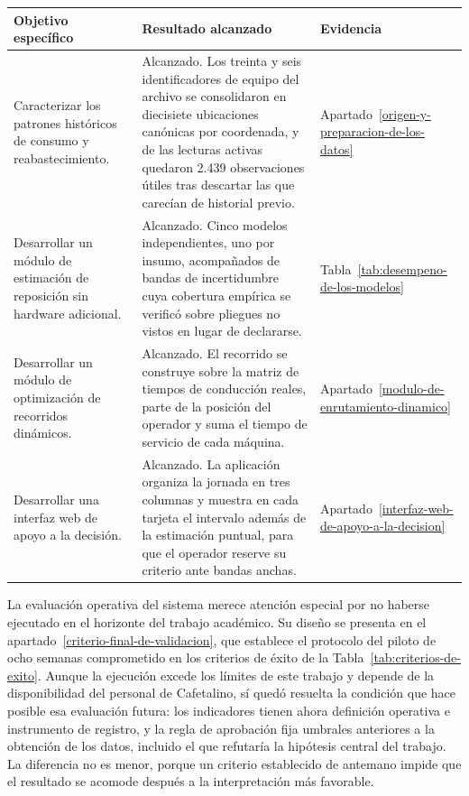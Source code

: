 {\small\setlength{\tabcolsep}{4pt}
\begin{longtable}[]{@{}
  >{\raggedright\arraybackslash}p{}
  >{\raggedright\arraybackslash}p{}
  >{\raggedright\arraybackslash}p{}@{}}
\toprule\noalign{}
\textbf{Objetivo específico} & \textbf{Resultado alcanzado} & \textbf{Evidencia} \\
\midrule\noalign{}
\endhead
\bottomrule\noalign{}
\endlastfoot
Caracterizar los patrones históricos de consumo y reabastecimiento. & Alcanzado. Los treinta y seis identificadores de equipo del archivo se consolidaron en diecisiete ubicaciones canónicas por coordenada, y de las lecturas activas quedaron 2.439 observaciones útiles tras descartar las que carecían de historial previo. & Apartado~\ref{origen-y-preparacion-de-los-datos} \\
Desarrollar un módulo de estimación de reposición sin hardware adicional. & Alcanzado. Cinco modelos independientes, uno por insumo, acompañados de bandas de incertidumbre cuya cobertura empírica se verificó sobre pliegues no vistos en lugar de declararse. & Tabla~\ref{tab:desempeno-de-los-modelos} \\
Desarrollar un módulo de optimización de recorridos dinámicos. & Alcanzado. El recorrido se construye sobre la matriz de tiempos de conducción reales, parte de la posición del operador y suma el tiempo de servicio de cada máquina. & Apartado~\ref{modulo-de-enrutamiento-dinamico} \\
Desarrollar una interfaz web de apoyo a la decisión. & Alcanzado. La aplicación organiza la jornada en tres columnas y muestra en cada tarjeta el intervalo además de la estimación puntual, para que el operador reserve su criterio ante bandas anchas. & Apartado~\ref{interfaz-web-de-apoyo-a-la-decision} \\
\end{longtable}}


La evaluación operativa del sistema merece atención especial por no haberse ejecutado en el horizonte del trabajo académico. Su diseño se presenta en el apartado~\ref{criterio-final-de-validacion}, que establece el protocolo del piloto de ocho semanas comprometido en los criterios de éxito de la Tabla~\ref{tab:criterios-de-exito}. Aunque la ejecución excede los límites de este trabajo y depende de la disponibilidad del personal de Cafetalino, sí quedó resuelta la condición que hace posible esa evaluación futura: los indicadores tienen ahora definición operativa e instrumento de registro, y la regla de aprobación fija umbrales anteriores a la obtención de los datos, incluido el que refutaría la hipótesis central del trabajo. La diferencia no es menor, porque un criterio establecido de antemano impide que el resultado se acomode después a la interpretación más favorable.

